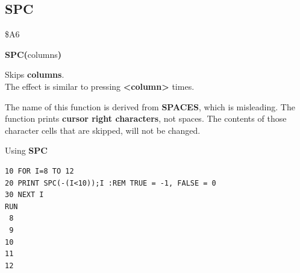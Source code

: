
\newpage
\subsection{SPC}
\begin{description}[leftmargin=2cm,style=nextline]
\item [Token:] \$A6
\item [Format:] {\bf SPC(}columns{\bf)}
\item [Usage:] Skips {\bf columns}. \\
               The effect is similar to pressing \megakey{$\rightarrow$}
               {\bf <column>} times.

\item [Remarks:] The name of this function is derived from
                 {\bf SPACES}, which is misleading.
                 The function prints {\bf cursor right characters},
                 not spaces. The contents of those character
                 cells that are skipped, will not be changed.

\item [Example:] Using {\bf SPC}
\begin{tcolorbox}[colback=black,coltext=white]
\verbatimfont{\codefont}
\begin{verbatim}
10 FOR I=8 TO 12
20 PRINT SPC(-(I<10));I :REM TRUE = -1, FALSE = 0
30 NEXT I
RUN
 8
 9
10
11
12
\end{verbatim}
\end{tcolorbox}
\end{description}


\newpage
